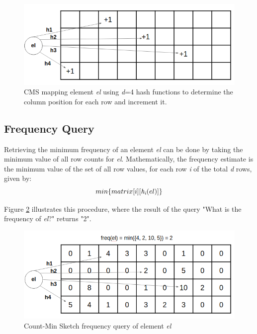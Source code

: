 \begin{figure}[!htb]
    \begin{center}
      \includegraphics[scale=0.5]{figures/insertion-cms.png}
      \caption[Count-Min Sketch insertion]{CMS mapping element \textit{el} using \textit{d}=4 hash functions to determine the column position for each row and increment it.}
      \label{fig:cms}
    \end{center}
\end{figure}

\subsection*{Frequency Query}
Retrieving the minimum frequency of an element \textit{el} can be done by taking the minimum value of all row counts for \textit{el}. Mathematically, the frequency estimate is the minimum value of the set of all row values, for each row \textit{i} of the total \textit{d} rows, given by:
\[ min \{matrix[i][\textit{h\textsubscript{i}}(el)]\} \]

Figure \ref{fig:query-cms} illustrates this procedure, where the result of the query "What is the frequency of \textit{el}?" returns "2".
   
\begin{figure}[!htb]
    \begin{center}
      \includegraphics[scale=0.5]{figures/query-cms.png}
      \caption[Count-Min Sketch frequency query]{Count-Min Sketch frequency query of element \textit{el}}
      \label{fig:query-cms}
    \end{center}
\end{figure}

